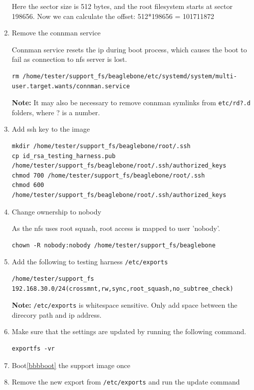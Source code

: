 \documentclass[a4paper,11pt]{article}
\newcommand{\note}{\textbf{Note: }}
\newcommand{\cmd}[1]{\texttt{#1}}
\begin{document}
\begin{enumerate}
Here the sector size is 512 bytes, and the root filesystem starts at sector 198656. Now we can calculate the offset: 512*198656 = 101711872 

\item Remove the connman service

Connman service resets the ip during boot process, which causes the boot to fail as connection to nfs server is lost.


\begin{lstlisting}
rm /home/tester/support_fs/beaglebone/etc/systemd/system/multi-user.target.wants/connman.service
\end{lstlisting}

\note It may also be necessary to remove connman symlinks from \cmd{etc/rd?.d} folders, where ? is a number.


\item Add ssh key to the image

\begin{lstlisting}
mkdir /home/tester/support_fs/beaglebone/root/.ssh
cp id_rsa_testing_harness.pub /home/tester/support_fs/beaglebone/root/.ssh/authorized_keys
chmod 700 /home/tester/support_fs/beaglebone/root/.ssh
chmod 600 /home/tester/support_fs/beaglebone/root/.ssh/authorized_keys
\end{lstlisting}


\item Change ownership to nobody

As the nfs uses root squash, root access is mapped to user 'nobody'.

\begin{lstlisting}
chown -R nobody:nobody /home/tester/support_fs/beaglebone
\end{lstlisting}



\item Add the following to testing harness \cmd{/etc/exports}

\begin{lstlisting}
/home/tester/support_fs 192.168.30.0/24(crossmnt,rw,sync,root_squash,no_subtree_check) 
\end{lstlisting}

\note \cmd{/etc/exports} is whitespace sensitive. Only add space between the direcory path and ip address.

\item Make sure that the settings are updated by running the following command.

\begin{lstlisting}
exportfs -vr
\end{lstlisting}

\item Boot\ref{bbbboot} the support image once

\item Remove the new export from \cmd{/etc/exports} and run the update command

\end{enumerate}
\end{document}
